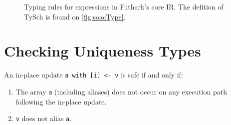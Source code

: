 \begin{figure}[bt]









\caption{Typing rules for expressions in Futhark's core IR.  The
  defition of TySch is found on \cref{fig:soacType}.}
\label{fig:srcTypeRulesExps}

\end{figure}


\FloatBarrier
\section{Checking Uniqueness Types}
\label{sec:uniqueness-formalism}

An in-place update \lstinline{a with [i] <- v} is safe if and only if:

\begin{enumerate}
\item The array \texttt{a} (including aliases) does not occur on any
  execution path following the in-place update.
\item \texttt{v} does not alias \texttt{a}.
\end{enumerate}

